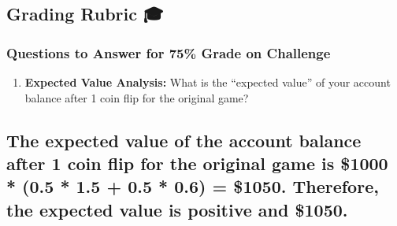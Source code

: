 \documentclass[
  letterpaper,
  DIV=11,
  numbers=noendperiod]{scrartcl}
\newenvironment{Shaded}{\begin{snugshade}}{\end{snugshade}}
\newcommand{\BuiltInTok}[1]{\textcolor[rgb]{0.00,0.23,0.31}{#1}}
\newcommand{\CommentTok}[1]{\textcolor[rgb]{0.37,0.37,0.37}{#1}}
\newcommand{\DecValTok}[1]{\textcolor[rgb]{0.68,0.00,0.00}{#1}}
\newcommand{\FloatTok}[1]{\textcolor[rgb]{0.68,0.00,0.00}{#1}}
\newcommand{\NormalTok}[1]{\textcolor[rgb]{0.00,0.23,0.31}{#1}}
\newcommand{\OperatorTok}[1]{\textcolor[rgb]{0.37,0.37,0.37}{#1}}
\newcommand{\SpecialCharTok}[1]{\textcolor[rgb]{0.37,0.37,0.37}{#1}}
\newcommand{\SpecialStringTok}[1]{\textcolor[rgb]{0.13,0.47,0.30}{#1}}
\providecommand{\tightlist}{%
  \setlength{\itemsep}{0pt}\setlength{\parskip}{0pt}}
\theoremstyle{definition}
\theoremstyle{remark}
\begin{document}
\subsection{Grading Rubric 🎓}\label{grading-rubric}

\subsubsection{Questions to Answer for 75\% Grade on
Challenge}\label{questions-to-answer-for-75-grade-on-challenge}

\begin{enumerate}
\def\labelenumi{\arabic{enumi}.}
\tightlist
\item
  \textbf{Expected Value Analysis:} What is the ``expected value'' of
  your account balance after 1 coin flip for the original game?
\end{enumerate}

\subsection{The expected value of the account balance after 1 coin flip
for the original game is \$1000 * (0.5 * 1.5 + 0.5 * 0.6) = \$1050.
Therefore, the expected value is positive and
\$1050.}\label{the-expected-value-of-the-account-balance-after-1-coin-flip-for-the-original-game-is-1000-0.5-1.5-0.5-0.6-1050.-therefore-the-expected-value-is-positive-and-1050.}

\label{q1-expected-value}
\begin{Shaded}
\end{Shaded}
\end{document}
